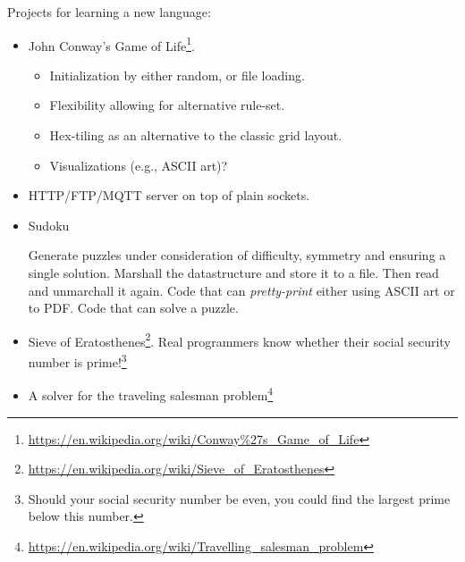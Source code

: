 Projects for learning a new language:
\begin{itemize}
  \item John Conway's Game of Life\footnote{\url{https://en.wikipedia.org/wiki/Conway\%27s_Game_of_Life}}\cite{Gardener1970MathematicalGT}.
    \begin{itemize}
      \item Initialization by either random, or file loading.
      \item Flexibility allowing for alternative rule-set.
      \item Hex-tiling as an alternative to the classic grid layout.
      \item Visualizations (e.g., ASCII art)?
    \end{itemize}
  \item HTTP/FTP/MQTT server on top of plain sockets.
  \item Sudoku
    \begin{itemize}
       Generate puzzles under consideration of difficulty, symmetry and ensuring a single solution.
       Marshall the datastructure and store it to a file. Then read and unmarchall it again.
       Code that can \textsl{pretty-print} either using ASCII art or to PDF.
       Code that can solve a puzzle.
    \end{itemize}
  \item Sieve of Eratosthenes\footnote{\url{https://en.wikipedia.org/wiki/Sieve_of_Eratosthenes}}. Real programmers know whether their social security number is prime!\footnote{Should your social security number be even, you could find the largest prime below this number.}
  \item A solver for the traveling salesman problem\footnote{\url{https://en.wikipedia.org/wiki/Travelling_salesman_problem}}
\end{itemize}










